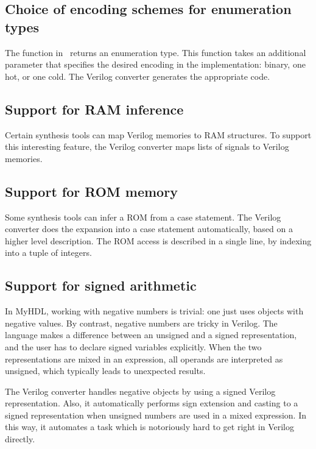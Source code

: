 \subsection{Choice of encoding schemes for enumeration types\label{conv-features-enum}}
The  function in \myhdl\ returns an enumeration type. This
function takes an additional parameter  that specifies the
desired encoding in the implementation: binary, one hot, or one cold.
The Verilog converter generates the appropriate code.

\subsection{Support for RAM inference \label{conf-features-ram}}
Certain synthesis tools can map Verilog memories to RAM
structures. To support this interesting feature, the Verilog converter
maps lists of signals to Verilog memories.

\subsection{Support for ROM memory \label{conf-features-rom}}
Some synthesis tools can infer a ROM
from a case statement. The Verilog converter does the expansion into
a case statement automatically, based on a higher level
description. The ROM access is described in a single line, by
indexing into a tuple of integers.

\subsection{Support for signed arithmetic \label{conf-features-signed}}
In MyHDL, working with negative numbers is trivial: one just uses
 objects with negative values.
By contrast, negative numbers are tricky in Verilog. The language
makes a difference between an unsigned and a signed representation,
and the user has to declare signed variables explicitly.  When the two
representations are mixed in an expression, all operands are
interpreted as unsigned, which typically leads to unexpected results.

The Verilog converter handles negative  objects by using
a signed Verilog representation. Also, it automatically performs sign
extension and casting to a signed representation when unsigned numbers
are used in a mixed expression. In this way, it automates a task which
is notoriously hard to get right in Verilog directly.

